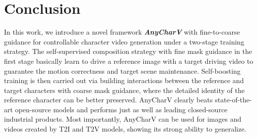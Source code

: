 \section{Conclusion}


In this work, we introduce a novel framework \textbf{\textit{AnyCharV}} with fine-to-coarse guidance for controllable character video generation under a two-stage training strategy.
The self-supervised composition strategy with fine mask guidance in the first stage basically learn to drive a reference image with a target driving video to guarantee the motion correctness and target scene maintenance.
Self-boosting training is then carried out via building interactions between the reference and target characters with coarse mask guidance, where the detailed identity of the reference character can be better preserved.
AnyCharV clearly beats state-of-the-art open-source models and performs just as well as leading closed-source industrial products.
Most importantly, AnyCharV can be used for images and videos created by T2I and T2V models, showing its strong ability to generalize.
